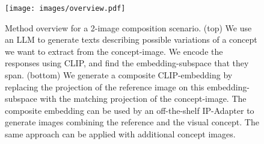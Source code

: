 \begin{figure}
    \centering
    \setlength{\belowcaptionskip}{-5pt}
    \setlength{\abovecaptionskip}{4pt}
    
    \texttt{[image: images/overview.pdf]}
    \caption{
    Method overview for a 2-image composition scenario. (top) We use an LLM to generate texts describing possible variations of a concept we want to extract from the concept-image. We encode the responses using CLIP, and find the embedding-subspace that they span.
    (bottom) We generate a composite CLIP-embedding by replacing the projection of the reference image on this embedding-subspace with the matching projection of the concept-image. The composite embedding can be used by an off-the-shelf IP-Adapter to generate images combining the reference and the visual concept. The same approach can be applied with additional concept images.}
\label{fig:method}
\end{figure}
